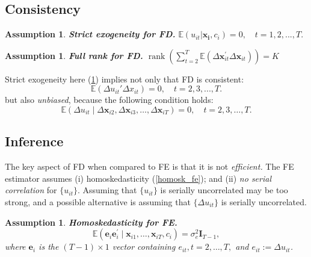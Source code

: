 \documentclass[11pt, a4paper]{report}
\theoremstyle{plain}
\newtheorem{assump}[thm]{Assumption}
\theoremstyle{plain}
\theoremstyle{remark}
\begin{document}
\subsection{Consistency}

\begin{assump}
    \textbf{Strict exogeneity for FD.} $\mathbb{E}(u_{it} | \mathbf{x_i},c_i) = 0, \quad t = 1,2,...,T.$ \label{strict_exog_fd}
\end{assump}


\begin{assump}
    \textbf{Full rank for FD.} $\operatorname{rank}\left(\sum_{t=2}^{T} \mathbb{E}\left(\Delta \mathbf{x}_{i t}^{\prime} \Delta \mathbf{x}_{i t}\right)\right)=K$ \label{full_rank_fd}
\end{assump}

Strict exogeneity here (\ref{strict_exog_fd}) implies not only that FD is consistent:
\begin{equation}
    \mathbb{E}(\Delta u_{it}' {\Delta x_{it}}) = 0, \quad t = 2,3,...,T.
\end{equation}
but also \textit{unbiased}, because the following condition holds:
\begin{equation}
    \mathbb{E}\left(\Delta u_{i t} \mid \Delta \mathbf{x}_{i 2}, \Delta \mathbf{x}_{i 3}, \ldots, \Delta \mathbf{x}_{i T}\right)=0, \quad t=2,3, \ldots, T.
\end{equation}



\subsection{Inference}

The key aspect of FD when compared to FE is that it is not \textit{efficient.} The FE estimator assumes (i) homoskedasticity (\ref{homosk_fe}); and (ii) \textit{no serial correlation} for $\{u_{it}\}$. Assuming that $\{u_{it}\}$ is serially uncorrelated may be too strong, and a possible alternative is assuming that $\{\Delta u_{it}\}$ is serially uncorrelated. 

\begin{assump} \textbf{Homoskedasticity for FE.} \label{homosk_fd}
    $$ \mathbb{E}\left(\mathbf{e}_{i} \mathbf{e}_{i}^{\prime} \mid \mathbf{x}_{i 1}, \ldots, \mathbf{x}_{i T}, c_{i}\right)=\sigma_{e}^{2} \mathbf{I}_{T-1},$$ 
    where $\mathbf{e}_{i}$ is the $(T-1) \times 1$ vector containing $e_{i t}, t=2, \ldots, T,$ and ${e}_{it} := \Delta u_{it}$.
 \end{assump}
\end{document}
